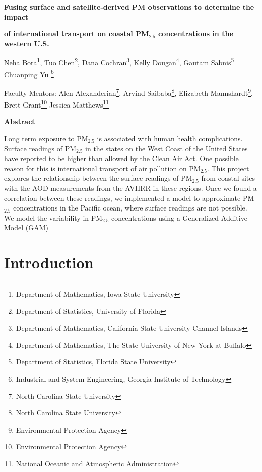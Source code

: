 \documentclass[10pt]{article}
\begin{document}
\centerline{\large \bf Fusing surface and satellite-derived PM observations to determine the impact } 

\centerline{\large \bf of international transport on coastal PM$_{2.5}$ concentrations in the western U.S.}

\vspace{.1truein}

\def\thefootnote{\arabic{footnote}}
\begin{center}
  Neha Bora\footnote{Department of Mathematics, Iowa State University},
  Tuo Chen\footnote{Department of Statistics, University of Florida},
  Dana Cochran\footnote{Department of Mathematics, California State University Channel Islands},
  Kelly Dougan\footnote{Department of Mathematics, The State University of New York at Buffalo},
  Gautam Sabnis\footnote{Department of Statistics, Florida State University}
  Chuanping Yu \footnote{Industrial and System Engineering, Georgia Institute of Technology}
\end{center}


\begin{center}
Faculty Mentors: Alen Alexanderian\footnote{North Carolina State University},
Arvind Saibaba\footnote{North Carolina State University},
Elizabeth Mannshardt\footnote{Environmental Protection Agency}, 
Brett Grant\footnote{Environmental Protection Agency}
Jessica Matthews\footnote{National Oceanic and Atmospheric Administration}
\end{center}


\vspace{.3truein}
\centerline{\bf Abstract}

Long term exposure to PM$_{2.5}$ is associated with human health complications. Surface readings of PM$_{2.5}$ in the states on the West Coast of the United States have reported to be higher than allowed by the Clean Air Act. One possible reason for this is international transport of air pollution on PM$_{2.5}$. This project explores the relationship between the surface readings of PM$_{2.5}$ from coastal sites with the AOD measurements from the AVHRR in these regions. Once we found a correlation between these readings, we implemented a model to approximate PM$_{2.5}$ concentrations in the Pacific ocean, where surface readings are not possible. We model the variability in PM$_{2.5}$ concentrations using a Generalized Additive Model (GAM) 

\section{Introduction}
\end{document}
